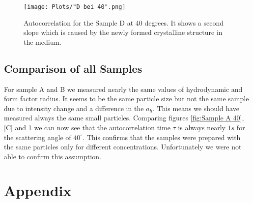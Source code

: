 \documentclass[]{article}
\begin{document}
\begin{figure}[!htbp]
\centering
\texttt{[image: Plots/"D bei 40".png]}
\caption{Autocorrelation for the Sample D at 40 degrees. It shows a second slope which is caused by the newly formed crystalline structure in the medium.}
\label{D}
\end{figure}



\subsection{Comparison of all Samples}
For sample A and B we measured nearly the same values of hydrodynamic and form factor radius. It seems to be the same particle size but not the same sample due to intensity change and a difference in the $a_h$. This means we should have measured always the same small particles. Comparing figures \ref{fig:Sample A 40}, \ref{C} and \ref{D} we can now see that the autocorrelation time $\tau$ is always nearly $1s$ for the scattering angle of $40^\circ$. This confirms that the samples were prepared with the same particles only for different concentrations. Unfortunately we were not able to confirm this assumption.


\newpage
\newpage
\section{Appendix}
\end{document}
